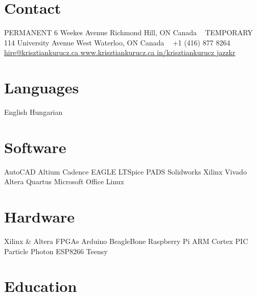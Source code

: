 \documentclass[hidelinks]{kkurucz-cv}
\begin{document}


\begin{aside} %
\section{Contact}
{\headingfont PERMANENT}
6 Weekes Avenue
Richmond Hill, ON
Canada
~
{\headingfont TEMPORARY}
114 University Avenue West
Waterloo, ON
Canada
~
{+1 (416) 877 8264\hspace{1.5mm}\mobile}
~
\href{mailto:hire@krisztiankurucz.ca}{hire@krisztiankurucz.ca }\mail
\href{http://www.krisztiankurucz.ca}{www.krisztiankurucz.ca }\website
\href{http://ca.linkedin.com/in/krisztiankurucz}{in/krisztiankurucz }\linkedin
\href{http://www.github.com/jazzkr}{jazzkr }\github
\section{Languages}
English
Hungarian
\section{Software}
AutoCAD
Altium
Cadence
EAGLE
LTSpice
PADS
Solidworks
Xilinx Vivado
Altera Quartus
Microsoft Office
Linux
\section{Hardware}
Xilinx \& Altera FPGAs
Arduino
BeagleBone
Raspberry Pi
ARM Cortex
PIC
Particle Photon
ESP8266
Teensy
\end{aside}



\vspace{-4mm}
\section{Education}
\end{document}
